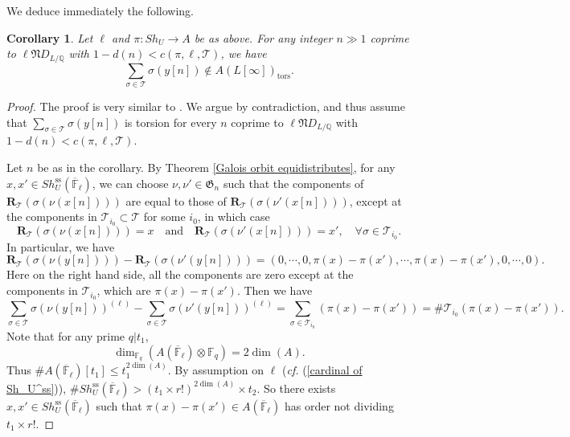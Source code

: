 \documentclass[11pt,oneside,reqno]{amsart}
\newcommand{\ssrm}{\mathrm{ss}}
\newcommand{\F}{\mathbb{F}}
\newcommand{\Q}{\mathbb{Q}}
\newcommand{\Tcal}{\mathcal{T}}
\newcommand{\Rbf}{\mathbf{R}}
\newcommand{\Gfrak}{\mathfrak{G}}
\newcommand{\Nfrak}{\mathfrak{N}}
\theoremstyle{plain}
\newtheorem{corollary}[theorem]{Corollary}
\begin{document}
	We deduce immediately the following.
	\begin{corollary}\label{generalized Mazur's conjecture}
		Let $\ell$ and $\pi\colon Sh_U\to A$ be as above. For any integer $n\gg1$ coprime to $\ell\Nfrak D_{L/\Q}$ with $1-d(n)<c(\pi,\ell,\Tcal)$, we have
		\[
		\sum_{\sigma\in\Tcal}\sigma(y[n])
		\notin
		A(L[\infty])_\mathrm{tors}.
		\]
	\end{corollary}
	\begin{proof}
		The proof is very similar to \cite[Theorem 9.2]{Zhang2025}. We argue by contradiction, and thus assume that $\sum_{\sigma\in\Tcal}\sigma(y[n])$ is torsion for every $n$ coprime to $\ell\Nfrak D_{L/\Q}$ with $1-d(n)<c(\pi,\ell,\Tcal)$.
		
		
		Let $n$ be as in the corollary. By Theorem \ref{Galois orbit equidistributes}, for any $x,x'\in Sh_U^\ssrm(\overline{\F}_\ell)$, we can choose $\nu,\nu'\in\Gfrak_n$ such that the components of $\Rbf_{\Tcal}(\sigma(\nu(x[n])))$ are equal to those of $\Rbf_{\Tcal}(\sigma(\nu'(x[n])))$, except at the components in $\Tcal_{i_0}\subset\Tcal$ for some $i_0$, in which case
		\[
		\Rbf_{\Tcal}(\sigma(\nu(x[n])))=x
		\quad
		\text{and}
		\quad
		\Rbf_{\Tcal}(\sigma(\nu'(x[n])))=x',
		\quad
		\forall
		\sigma\in\Tcal_{i_0}.
		\]
		In particular, we have
		\[
		\Rbf_{\Tcal}(\sigma(\nu(y[n])))
		-
		\Rbf_{\Tcal}(\sigma(\nu'(y[n])))
		=
		\left(
		0,\cdots,0,
		\pi(x)-\pi(x'),\cdots,\pi(x)-\pi(x'),
		0,\cdots,0
		\right).
		\]
		Here on the right hand side, all the components are zero except at the components in $\Tcal_{i_0}$, which are $\pi(x)-\pi(x')$. Then we have
		\[
		\sum_{\sigma\in\Tcal}\sigma(\nu(y[n]))^{(\ell)}
		-
		\sum_{\sigma\in\Tcal}\sigma(\nu'(y[n]))^{(\ell)}
		=
		\sum_{\sigma\in\Tcal_{i_0}}(\pi(x)-\pi(x'))
		=
		\#\Tcal_{i_0}(\pi(x)-\pi(x')).
		\]
		Note that for any prime $q|t_1$,
		\[
		\dim_{\F_q}(A(\overline{\F}_\ell)\otimes\F_q)=2\dim(A).
		\]
		Thus $\#A(\overline{\F}_\ell)[t_1]\leq t_1^{2\dim(A)}$. By assumption on $\ell$ (\emph{cf.} (\ref{cardinal of Sh_U^ss})), $\#Sh_U^\ssrm(\overline{\F}_\ell)>(t_1\times r!)^{2\dim(A)}\times t_2$. So there exists $x,x'\in Sh_U^\ssrm(\overline{\F}_\ell)$ such that
		$\pi(x)-\pi(x')\in A(\overline{\F}_\ell)$ has order not dividing $t_1\times r!$.
		
		
		

\end{proof}
\end{document}

